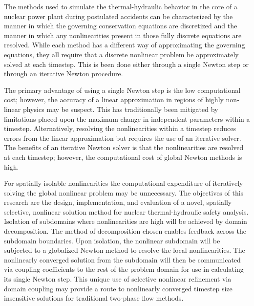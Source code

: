 The methods used to simulate the thermal-hydraulic behavior in the core of a nuclear power plant during postulated accidents can be characterized by the manner in which the governing conservation equations are discretized and the manner in which any nonlinearities present in those fully discrete equations are resolved.
While each method has a different way of approximating the governing equations, they all require that a discrete nonlinear problem be approximately solved at each timestep.
This is been done either through a single Newton step or through an iterative Newton procedure.

The primary advantage of using a single Newton step is the low computational cost; however, the accuracy of a linear approximation in regions of highly non-linear physics may be suspect.
This has traditionally been mitigated by limitations placed upon the maximum change in independent parameters within a timestep.
Alternatively, resolving the nonlinearities within a timestep reduces errors from the linear approximation but requires the use of an iterative solver.
The benefits of an iterative Newton solver is that the nonlinearities are resolved at each timestep; however, the computational cost of global Newton methods is high.

For spatially isolable nonlinearities the computational expenditure of iteratively solving the global nonlinear problem may be unnecessary.
The objectives of this research are the design, implementation, and evaluation of a novel, spatially selective, nonlinear solution method for nuclear thermal-hydraulic safety analysis.
Isolation of subdomains where nonlinearities are high will be achieved by domain decomposition.
The method of decomposition chosen enables feedback across the subdomain boundaries. 
Upon isolation, the nonlinear subdomain will be subjected to a globalized Newton method to resolve the local nonlinearities.
The nonlinearly converged solution from the subdomain will then be communicated via coupling coefficients to the rest of the problem domain for use in calculating its single Newton step.
This unique use of selective nonlinear refinement via domain coupling may provide a route to nonlinearly converged timestep size insensitive solutions for traditional two-phase flow methods.